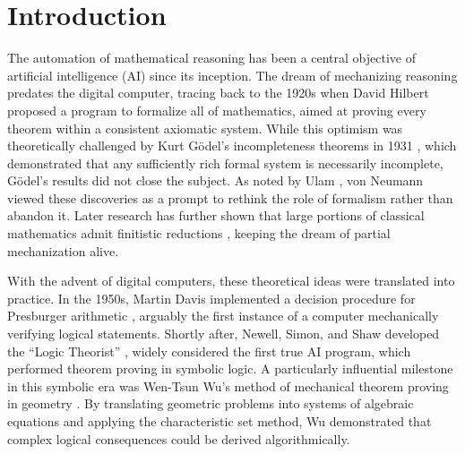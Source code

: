 \documentclass[11pt]{article}
\numberwithin{equation}{section}
\begin{document}

\section{Introduction}

The automation of mathematical reasoning has been a central objective of artificial intelligence (AI) since its inception. The dream of mechanizing reasoning predates the digital computer, tracing back to the 1920s when David Hilbert proposed a program to formalize all of mathematics, aimed at proving every theorem within a consistent axiomatic system. While this optimism was theoretically challenged by Kurt Gödel’s incompleteness theorems in 1931 \cite{godel1931formally}, which demonstrated that any sufficiently rich formal system is necessarily incomplete, Gödel’s results did not close the subject. As noted by Ulam \cite{bams/1183522369}, von Neumann viewed these discoveries as a prompt to rethink the role of formalism rather than abandon it. Later research has further shown that large portions of classical mathematics admit finitistic reductions \cite{simpson1988partial}, keeping the dream of partial mechanization alive.

With the advent of digital computers, these theoretical ideas were translated into practice. In the 1950s, Martin Davis implemented a decision procedure for Presburger arithmetic \cite{Clarke_1966,Davis1983ThePA}, arguably the first instance of a computer mechanically verifying logical statements. Shortly after, Newell, Simon, and Shaw developed the ``Logic Theorist'' \cite{1056797}, widely considered the first true AI program, which performed theorem proving in symbolic logic. A particularly influential milestone in this symbolic era was Wen-Tsun Wu’s method of mechanical theorem proving in geometry \cite{wen1986basic,wu2012mechanical}. By translating geometric problems into systems of algebraic equations and applying the characteristic set method, Wu demonstrated that complex logical consequences could be derived algorithmically.
\end{document}
